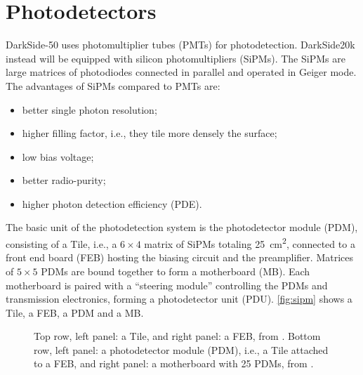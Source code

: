\section{Photodetectors}

DarkSide-50 uses photomultiplier tubes (PMTs) for photodetection. DarkSide20k
instead will be equipped with silicon photomultipliers (SiPMs). The SiPMs are
large matrices of photodiodes connected in parallel and operated in Geiger
mode. The advantages of SiPMs compared to PMTs are:
%
\begin{itemize}
    
    \item better single photon resolution;
    
    \item higher filling factor, i.e., they tile more densely the surface;
    
    \item low bias voltage;
    
    \item better radio-purity;
    
    \item higher photon detection efficiency (PDE).

\end{itemize}

The basic unit of the photodetection system is the photodetector module (PDM),
consisting of a Tile, i.e., a $6\times 4$ matrix of SiPMs totaling
\SI{25}{cm^2}, connected to a front end board (FEB) hosting the biasing circuit
and the preamplifier. Matrices of $5\times 5$ PDMs are bound together to form a
motherboard (MB). Each motherboard is paired with a ``steering module''
controlling the PDMs and transmission electronics, forming a photodetector unit
(PDU). \autoref{fig:sipm} shows a Tile, a FEB, a PDM and a MB.

\begin{figure}
    
    \newlength\sipmheight
    \setlength\sipmheight{5cm}
    

    \vspace*{1ex}
    
    \caption{\label{fig:sipm} Top row, left panel: a Tile, and right panel: a
    FEB, from \cite[42]{marasciulli2019}. Bottom row, left panel: a
    photodetector module (PDM), i.e., a Tile attached to a FEB, and right
    panel: a motherboard with 25 PDMs, from \cite[4]{aalseth2019}.}
    
\end{figure}

